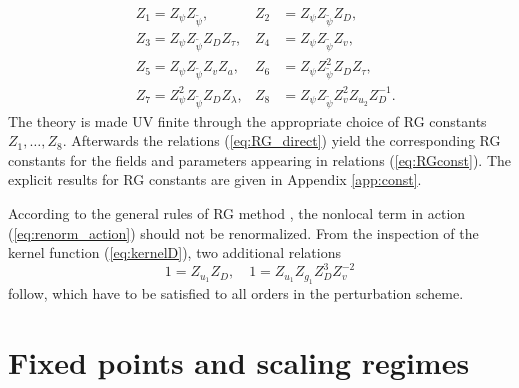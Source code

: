 \documentclass[aps,pre,url,twocolumn,superscriptaddress]{revtex4-1}
\begin{document}
\begin{align}
  \label{eq:RG_direct}
  &Z_1  = Z_\psi Z_{\tilde{\psi}}, 
  & Z_2 & =  Z_\psi Z_{\tilde{\psi}} Z_D, \nonumber \\
  &Z_3  = Z_\psi Z_{\tilde{\psi}} Z_D Z_\tau,
  & Z_4 & =  Z_\psi Z_{\tilde{\psi}} Z_v, \nonumber \\
  &Z_5  = Z_\psi Z_{\tilde{\psi}} Z_v Z_a, 
  & Z_6 & =  Z_\psi Z_{\tilde{\psi}}^2 Z_D Z_\tau, \nonumber   \\
  &Z_7  = Z_\psi^2 Z_{\tilde{\psi}} Z_D Z_\lambda, 
  & Z_8 & =  Z_\psi Z_{\tilde{\psi}} Z_v^2 Z_{u_2}Z_D^{-1}. 
\end{align}
The theory is made UV finite through the appropriate choice
of RG constants $Z_1,\ldots,Z_8$. Afterwards the relations (\ref{eq:RG_direct}) yield
 the corresponding RG constants for the fields and parameters
appearing in relations (\ref{eq:RGconst}). 
The explicit results for RG constants are given in Appendix \ref{app:const}.

According to the general rules of RG method \cite{Vasiliev}, the nonlocal term in action
(\ref{eq:renorm_action})
should not be renormalized. From the inspection of the kernel function (\ref{eq:kernelD}),
 two additional relations
\begin{equation}
  1  = Z_{u_1} Z_D, \quad
  1  =  Z_{u_1} Z_{g_1}Z_D^3 Z_v^{-2}
  \label{eq:RG_special}  
\end{equation}
 follow, which have to be satisfied to all orders in the perturbation scheme.


\section{Fixed points and scaling regimes \label{sec:regimes}}
%
%
%
\end{document}
